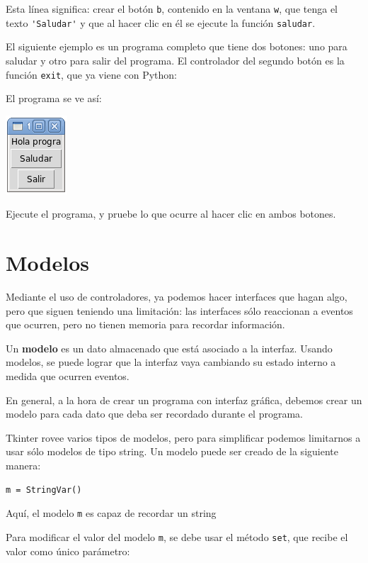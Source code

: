 Esta línea significa: crear el botón \lstinline!b!, contenido en la
ventana \lstinline!w!, que tenga el texto \lstinline!'Saludar'! y que al
hacer clic en él se ejecute la función \lstinline!saludar!.

El siguiente ejemplo es un programa completo que tiene dos botones: uno
para saludar y otro para salir del programa. El controlador del segundo
botón es la función \lstinline!exit!, que ya viene con Python:

El programa se ve así:

\includegraphics{../diapos/programas/tkinter/capturas/04.png}

Ejecute el programa, y pruebe lo que ocurre al hacer clic en ambos
botones.

\section{Modelos}

Mediante el uso de controladores, ya podemos hacer interfaces que hagan
algo, pero que siguen teniendo una limitación: las interfaces sólo
reaccionan a eventos que ocurren, pero no tienen memoria para recordar
información.

Un \textbf{modelo} es un dato almacenado que está asociado a la
interfaz. Usando modelos, se puede lograr que la interfaz vaya cambiando
su estado interno a medida que ocurren eventos.

En general, a la hora de crear un programa con interfaz gráfica, debemos
crear un modelo para cada dato que deba ser recordado durante el
programa.

Tkinter rovee varios tipos de modelos, pero para simplificar podemos
limitarnos a usar sólo modelos de tipo string. Un modelo puede ser
creado de la siguiente manera:

\begin{lstlisting}
m = StringVar()
\end{lstlisting}

Aquí, el modelo \lstinline!m! es capaz de recordar un string

Para modificar el valor del modelo \lstinline!m!, se debe usar el método
\lstinline!set!, que recibe el valor como único parámetro:

